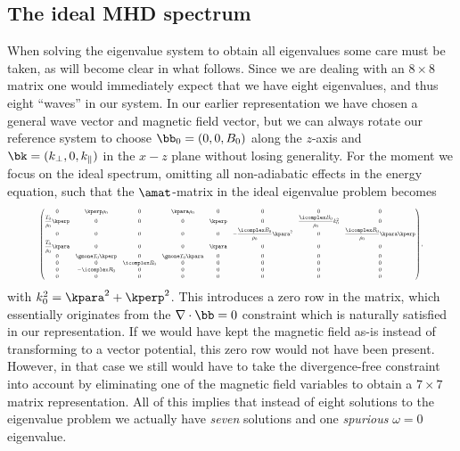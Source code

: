 \subsection{The ideal MHD spectrum}
When solving the eigenvalue system to obtain all eigenvalues some care must be taken, as will become clear in what follows. Since we are dealing with an $8 \times 8$ matrix one would immediately expect that we have eight eigenvalues, and thus eight ``waves'' in our system. In our earlier representation we have chosen a general wave vector and magnetic field vector, but we can always rotate our reference system to choose $\bb_0 = (0, 0, B_0)$ along the $z$-axis and $\bk = (k_\perp, 0, k_\parallel)$ in the $x-z$ plane without losing generality. For the moment we focus on the ideal spectrum, omitting all non-adiabatic effects in the energy equation, such that the $\amat$-matrix in the ideal eigenvalue problem becomes
\begin{equation} \label{eq: ideal_matrix}
  \resizebox{0.89\hsize}{!}{$
    \begin{pmatrix}
      0 & \kperp \rho_0 & 0 & \kpara \rho_0 & 0 & 0 & 0 & 0 \\
      \dfrac{T_0}{\rho_0}\kperp & 0 & 0 & 0 & \kperp & 0 & \dfrac{\icomplex B_0}{\rho_0}k_0^2 & 0 \\
      0 & 0 & 0 & 0 & 0 & -\dfrac{\icomplex B_0}{\rho_0}\kpara^2 & 0 & \dfrac{\icomplex B_0}{\rho_0}\kpara \kperp \\
      \dfrac{T_0}{\rho_0}\kpara & 0 & 0 & 0 & \kpara & 0 & 0 & 0 \\
      0 & \gmone T_0 \kperp & 0 & \gmone T_0 \kpara & 0 & 0 & 0 & 0 \\
      0 & 0 & \icomplex B_0 & 0 & 0 & 0 & 0 & 0 \\
      0 & -\icomplex B_0 & 0 & 0 & 0 & 0 & 0 & 0 \\
      0 & 0 & 0 & 0 & 0 & 0 & 0 & 0
    \end{pmatrix},
  $}
\end{equation}
with $k_0^2 = \kpara^2 + \kperp^2$. This introduces a zero row in the matrix, which essentially originates from the $\nabla \cdot \bb = 0$ constraint which is naturally satisfied in our representation. If we would have kept the magnetic field as-is instead of transforming to a vector potential, this zero row would not have been present. However, in that case we still would have to take the divergence-free constraint into account by eliminating one of the magnetic field variables to obtain a $7 \times 7$ matrix representation. All of this implies that instead of eight solutions to the eigenvalue problem we actually have \emph{seven} solutions and one \emph{spurious} $\omega = 0$ eigenvalue.

